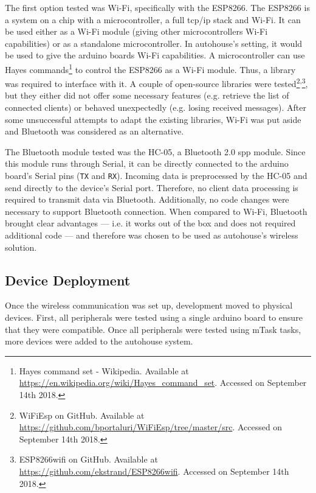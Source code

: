 The first option tested was Wi-Fi, specifically with the ESP8266. The ESP8266 is a system on a chip with a microcontroller, a full \acs{tcp}/\acs{ip} stack and Wi-Fi. It can be used either as a Wi-Fi module (giving other microcontrollers Wi-Fi capabilities) or as a standalone microcontroller. In \gls{autohouse}'s setting, it would be used to give the \gls{arduino} boards Wi-Fi capabilities. A microcontroller can use Hayes commands\footnote{Hayes command set - Wikipedia. Available at \url{https://en.wikipedia.org/wiki/Hayes_command_set}. Accessed on September 14th 2018.} to control the ESP8266 as a Wi-Fi module. Thus, a library was required to interface with it. A couple of open-source libraries were tested\footnote{WiFiEsp on GitHub. Available at \url{https://github.com/bportaluri/WiFiEsp/tree/master/src}. Accessed on September 14th 2018.}\textsuperscript{,}\footnote{ESP8266wifi on GitHub. Available at \url{https://github.com/ekstrand/ESP8266wifi}. Accessed on September 14th 2018.}, but they either did not offer some necessary features (e.g. retrieve the list of connected clients) or behaved unexpectedly (e.g. losing received messages). After some unsuccessful attempts to adapt the existing libraries, Wi-Fi was put aside and Bluetooth was considered as an alternative.

The Bluetooth module tested was the HC-05, a Bluetooth 2.0 \ac{spp} module. Since this module runs through Serial, it can be directly connected to the \gls{arduino} board's Serial pins (\texttt{TX} and \texttt{RX}). Incoming data is preprocessed by the HC-05 and send directly to the device's Serial port. Therefore, no client data processing is required to transmit data via Bluetooth. Additionally, no code changes were necessary to support Bluetooth connection. When compared to Wi-Fi, Bluetooth brought clear advantages --- i.e. it works out of the box and does not required additional code --- and therefore was chosen to be used as \gls{autohouse}'s wireless solution.

\subsection{Device Deployment}

Once the wireless communication was set up, development moved to physical devices. First, all peripherals were tested using a single \gls{arduino} board to ensure that they were compatible. Once all peripherals were tested using \gls{mTask} tasks, more devices were added to the \gls{autohouse} system. 

